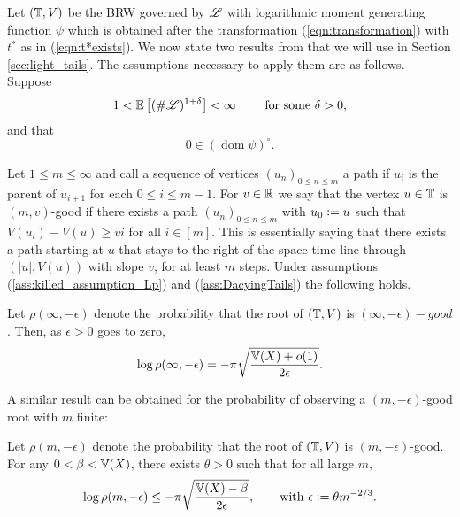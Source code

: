 Let $(\mathbb{T}, V)$ be the BRW governed by $\mathscr{L}$ with logarithmic moment generating function $\psi$ which is obtained after the transformation (\ref{eqn:transformation}) with $t^*$ as in (\ref{eqn:t*exists}). We now state two results from \cite{gantert2008asymptotics} that we will use in Section \ref{sec:light_tails}. The assumptions necessary to apply them are as follows. Suppose 
\begin{equation}\label{ass:killed_assumption_Lp}
1 < \mathbb{E}\left[ (\# \mathscr{L})^{1 + \delta} \right] < \infty\qquad\text{ for some } \delta > 0, 
\end{equation}
and that 
\begin{equation}\label{ass:DacyingTails}
0 \in (\operatorname*{dom} \psi)^\circ. 
\end{equation}

Let $1 \leq m \leq \infty$ and call a sequence of vertices $(u_n)_{0 \leq n \leq m}$ a path if $u_i$ is the parent of $u_{i+1}$ for each $0 \leq i \leq m-1$. For $v \in \mathbb{R}$ we say that the vertex $u \in \mathbb{T}$ is $(m, v)$-good if there exists a path $(u_n)_{0 \leq n \leq m}$ with $u_0 \vcentcolon= u$ such that $V(u_i) - V(u) \geq vi$ for all $i \in [m]$. This is essentially saying that there exists a path starting at $u$ that stays to the right of the space-time line through $(|u|, V(u))$ with slope $v$, for at least $m$ steps. Under assumptions (\ref{ass:killed_assumption_Lp}) and (\ref{ass:DacyingTails}) the following holds. 
\begin{theorem}\label{thm:infty_good}
Let $\rho(\infty, - \epsilon)$ denote the probability that the root of $(\mathbb{T}, V)$ is $(\infty, - \epsilon)-good$. Then, as $\epsilon > 0$ goes to zero, 
\begin{equation}\nonumber
\log\rho(\infty, - \epsilon) = - \pi \sqrt{\frac{\mathbb{V}(X) + o(1)}{2 \epsilon}}. 
\end{equation}
\end{theorem}

A similar result can be obtained for the probability of observing a $(m, - \epsilon)$-good root with $m$ finite:
\begin{theorem}\label{thm:finite_good}
Let $\rho(m, - \epsilon)$ denote the probability that the root of $(\mathbb{T}, V)$ is $(m, - \epsilon)$-good. For any $0 < \beta < \mathbb{V}(X)$, there exists $\theta > 0$ such that for all large $m$, 
\begin{equation}\nonumber
\log \rho(m, - \epsilon) \leq - \pi \sqrt{\frac{\mathbb{V}(X) - \beta}{2 \epsilon}}, \qquad \text{with } \epsilon \vcentcolon= \theta m^{-2/3}. 
\end{equation}
\end{theorem}

\newpage